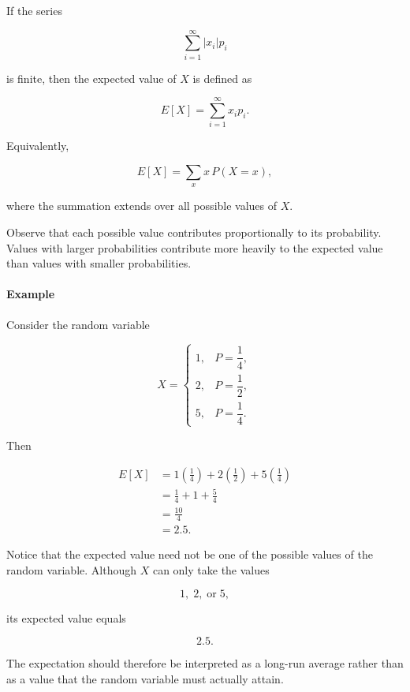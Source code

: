 \documentclass[11pt]{article}
\begin{document}
\begin{mdframed}[
		linewidth=0.8pt,
		roundcorner=6pt,
		backgroundcolor=gray!5,
		linecolor=gray!60,
		innertopmargin=10pt,
		innerbottommargin=10pt,
		innerleftmargin=10pt,
		innerrightmargin=10pt
		]
		If the series
		
		\[
		\sum_{i=1}^{\infty}|x_i|p_i
		\]
		
		is finite, then the expected value of $X$ is defined as
		
		\[
		\boxed{
			E[X]
			=
			\sum_{i=1}^{\infty}x_ip_i.
		}
		\]
		
		Equivalently,
		
		\[
		\boxed{
			E[X]
			=
			\sum_x x\,P(X=x),
		}
		\]
		
		where the summation extends over all possible values of $X$.
		
		Observe that each possible value contributes proportionally to its
		probability. Values with larger probabilities contribute more heavily to the
		expected value than values with smaller probabilities.
		
		\bigskip
		
		\paragraph{Example}
		
		Consider the random variable
		
		\[
		X=
		\begin{cases}
			1,&P=\dfrac14,\\[0.2cm]
			2,&P=\dfrac12,\\[0.2cm]
			5,&P=\dfrac14.
		\end{cases}
		\]
		
		Then
		
		\[
		\begin{aligned}
			E[X]
			&=
			1\left(\frac14\right)
			+
			2\left(\frac12\right)
			+
			5\left(\frac14\right)
			\\[0.3cm]
			&=
			\frac14
			+
			1
			+
			\frac54
			\\[0.3cm]
			&=
			\frac{10}{4}
			\\[0.2cm]
			&=
			2.5.
		\end{aligned}
		\]
		
		Notice that the expected value need not be one of the possible values of the
		random variable. Although $X$ can only take the values
		
		\[
		1,\;2,\;\text{or}\;5,
		\]
		
		its expected value equals
		
		\[
		2.5.
		\]
		
		The expectation should therefore be interpreted as a long-run average rather
		than as a value that the random variable must actually attain.
		

\end{mdframed}
\end{document}
